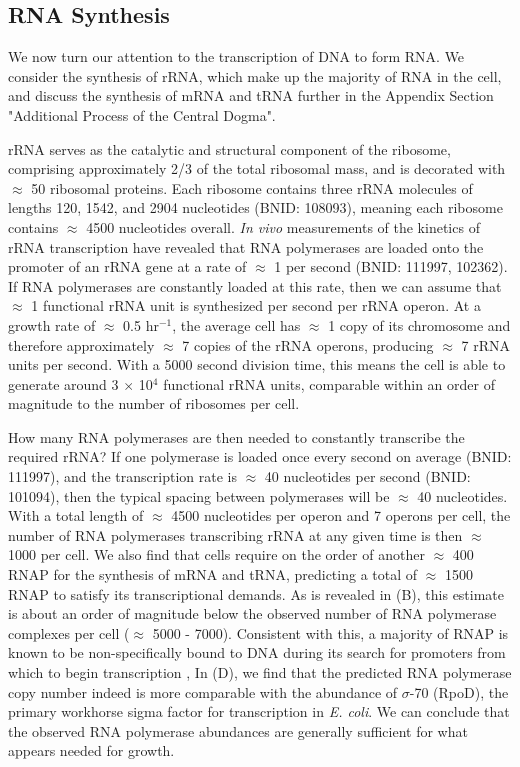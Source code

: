 \subsection{RNA Synthesis}\label{sec:RNA_synthesis}
We now turn our attention to the
transcription of DNA to form RNA. We consider the synthesis of rRNA,
which make up the majority of RNA in the cell, and
discuss the synthesis of mRNA and tRNA further in the Appendix Section
"Additional Process of the Central Dogma".

rRNA serves as the catalytic and structural component of the ribosome,
comprising approximately 2/3 of the total ribosomal mass, and is decorated with
$\approx$ 50 ribosomal proteins. Each ribosome contains three rRNA molecules of
lengths 120, 1542, and 2904 nucleotides (BNID: 108093), meaning each ribosome
contains $\approx$ 4500 nucleotides overall. \textit{In vivo} measurements of
the kinetics of rRNA transcription have revealed that RNA polymerases are loaded
onto the promoter of an rRNA gene at a rate of $\approx$ 1 per second (BNID:
111997, 102362). If RNA polymerases are constantly loaded at this rate, then we
can assume that $\approx$ 1 functional rRNA unit is synthesized per second per
rRNA operon.  At a growth rate of $\approx$ 0.5 hr$^{-1}$, the average cell has
$\approx$ 1 copy of its chromosome and therefore approximately $\approx$ 7
copies of the rRNA operons, producing $\approx$ 7 rRNA units per second. With a
5000 second division time, this means the cell is able to generate around 3
$\times$ 10$^4$ functional rRNA units, comparable within an order of magnitude
to the number of ribosomes per cell.

How many RNA polymerases are then needed to constantly transcribe the required
rRNA? If one polymerase is loaded once every second on average (BNID: 111997),
and the transcription rate is $\approx$ 40 nucleotides per second (BNID:
101094), then the typical spacing between polymerases will be $\approx$ 40
nucleotides. With a total length of $\approx$ 4500 nucleotides per operon and 7
operons per cell, the number of RNA polymerases transcribing rRNA at any given
time is then $\approx$ 1000 per cell. We also find that cells require on the
order of another $\approx$ 400 RNAP for the  synthesis of mRNA and tRNA,
predicting a total of  $\approx$ 1500 RNAP to satisfy its transcriptional
demands. As is revealed in (B), this estimate is about an
order of magnitude below the observed number of RNA polymerase complexes per
cell ($\approx$ 5000 - 7000). Consistent with this, a majority of RNAP is known
to be  non-specifically bound to DNA during its search for promoters from which
to begin transcription \citep{klumpp2008, patrick2015},  In
(D), we find that the predicted RNA polymerase copy number
indeed is more comparable with the abundance of $\sigma$-70 (RpoD), the primary
workhorse sigma factor for transcription in \textit{E. coli}. We can conclude
that the observed RNA polymerase abundances are generally sufficient for what
appears needed for growth.

